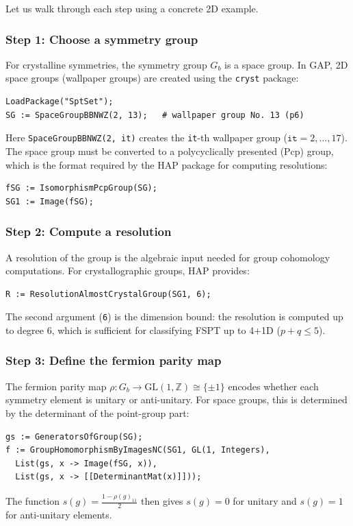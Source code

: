 \documentclass{SciPost}
\theoremstyle{definition}
\newcommand{\Z}{\mathbb{Z}}
\newcommand{\Gb}{G_b}
\begin{document}
Let us walk through each step using a concrete 2D example.

\subsubsection{Step 1: Choose a symmetry group}

For crystalline symmetries, the symmetry group $\Gb$ is a space group.
In GAP, 2D space groups (wallpaper groups) are created using the \texttt{cryst} package:
\begin{verbatim}
LoadPackage("SptSet");
SG := SpaceGroupBBNWZ(2, 13);   # wallpaper group No. 13 (p6)
\end{verbatim}
Here \texttt{SpaceGroupBBNWZ(2, it)} creates the \texttt{it}-th wallpaper group ($\texttt{it} = 2, \ldots, 17$).
The space group must be converted to a polycyclically presented (Pcp) group, which is the format required by the HAP package for computing resolutions:
\begin{verbatim}
fSG := IsomorphismPcpGroup(SG);
SG1 := Image(fSG);
\end{verbatim}

\subsubsection{Step 2: Compute a resolution}

A resolution of the group is the algebraic input needed for group cohomology computations.
For crystallographic groups, HAP provides:
\begin{verbatim}
R := ResolutionAlmostCrystalGroup(SG1, 6);
\end{verbatim}
The second argument (\texttt{6}) is the dimension bound: the resolution is computed up to degree 6, which is sufficient for classifying FSPT up to 4+1D ($p + q \leq 5$).

\subsubsection{Step 3: Define the fermion parity map}

The fermion parity map $\rho: \Gb \to \text{GL}(1, \Z) \cong \{\pm 1\}$ encodes whether each symmetry element is unitary or anti-unitary.
For space groups, this is determined by the determinant of the point-group part:
\begin{verbatim}
gs := GeneratorsOfGroup(SG);
f := GroupHomomorphismByImagesNC(SG1, GL(1, Integers),
  List(gs, x -> Image(fSG, x)),
  List(gs, x -> [[DeterminantMat(x)]]));
\end{verbatim}
The function $s(g) = \frac{1 - \rho(g)_{11}}{2}$ then gives $s(g) = 0$ for unitary and $s(g) = 1$ for anti-unitary elements.
\end{document}
